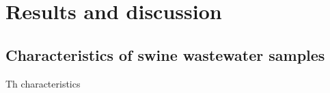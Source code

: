 \section{Results and discussion}
\subsection{Characteristics of swine wastewater samples}
Th characteristics 